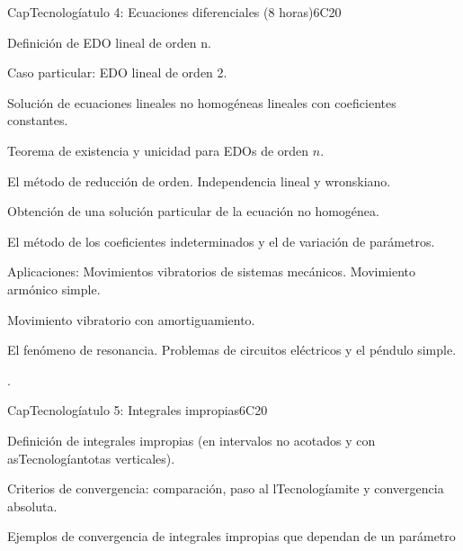 \begin{syllabus}
\begin{unit}{CapTecnologíatulo 4: Ecuaciones diferenciales (8 horas)}{}{}{6}{C20}


\begin{topics}
      \item Definición de EDO lineal de orden n. 
      \item Caso particular: EDO lineal de orden 2.
      \item Solución de ecuaciones lineales no homogéneas lineales con coeficientes constantes.
      \item Teorema de existencia y unicidad para EDOs de orden $n$.
      \item El método de reducción de orden. Independencia lineal y wronskiano.
      \item Obtención de una solución particular de la ecuación no homogénea.
      \item El método de los coeficientes indeterminados y el de variación de parámetros. 
      \item Aplicaciones: Movimientos vibratorios de sistemas mecánicos. Movimiento armónico simple. 
      \item  Movimiento vibratorio con amortiguamiento.
      \item El fenómeno de resonancia. Problemas de circuitos eléctricos y el péndulo simple.
   \end{topics}

   \begin{learningoutcomes}
      \item .
   \end{learningoutcomes}
\end{unit}

\begin{unit}{CapTecnologíatulo 5: Integrales impropias}{}{}{6}{C20}
\begin{topics}
	\item Definición de integrales impropias (en intervalos no acotados y con asTecnologíantotas verticales). 
    \item Criterios de convergencia: comparación, paso al lTecnologíamite y convergencia absoluta. 
    \item Ejemplos de convergencia de integrales impropias que dependan de un parámetro
   \end{topics}


\end{unit}
\end{syllabus}
